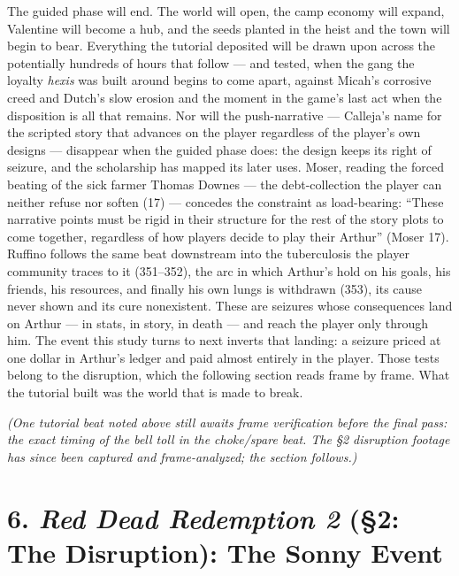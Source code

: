 \documentclass{article}
\begin{document}
The guided phase will end. The world will open, the camp economy will expand, Valentine will become a hub, and the seeds planted in the heist and the town will begin to bear. Everything the tutorial deposited will be drawn upon across the potentially hundreds of hours that follow — and tested, when the gang the loyalty \textit{hexis} was built around begins to come apart, against Micah's corrosive creed and Dutch's slow erosion and the moment in the game's last act when the disposition is all that remains.
Nor will the push-narrative — Calleja's name for the scripted story that advances on the player regardless of the player's own designs — disappear when the guided phase does: the design keeps its right of seizure, and the scholarship has mapped its later uses. Moser, reading the forced beating of the sick farmer Thomas Downes — the debt-collection the player can neither refuse nor soften (17) — concedes the constraint as load-bearing: ``These narrative points must be rigid in their structure for the rest of the story plots to come together, regardless of how players decide to play their Arthur'' (Moser 17). Ruffino follows the same beat downstream into the tuberculosis the player community traces to it (351--352), the arc in which Arthur's hold on his goals, his friends, his resources, and finally his own lungs is withdrawn (353), its cause never shown and its cure nonexistent. These are seizures whose consequences land on Arthur — in stats, in story, in death — and reach the player only through him. The event this study turns to next inverts that landing: a seizure priced at one dollar in Arthur's ledger and paid almost entirely in the player. Those tests belong to the disruption, which the following section reads frame by frame. What the tutorial built was the world that is made to break.

\textit{(One tutorial beat noted above still awaits frame verification before the final pass: the exact timing of the bell toll in the choke/spare beat. The §2 disruption footage has since been captured and frame-analyzed; the section follows.)}

\bigskip

\section*{6. \textit{Red Dead Redemption 2} (§2: The Disruption): The Sonny Event}
\end{document}
